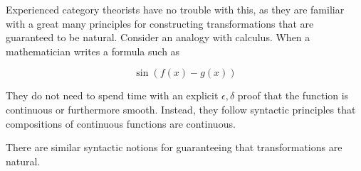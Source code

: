 \documentclass[sigplan,screen]{acmart}
\begin{document}
Experienced category theorists have no trouble with this, as they are
familiar with a great many principles for constructing transformations
that are guaranteed to be natural. Consider an analogy with
calculus. When a mathematician writes a formula such as

$$\sin(f(x) - g(x))$$

They do not need to spend time with an explicit $\epsilon,\delta$
proof that the function is continuous or furthermore smooth. Instead,
they follow syntactic principles that compositions of continuous
functions are continuous.

There are similar syntactic notions for guaranteeing that
transformations are natural.





\end{document}

